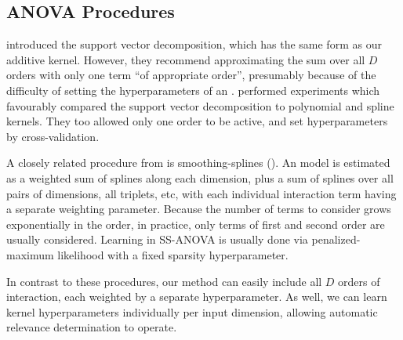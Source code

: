 \subsection{ANOVA Procedures}

\citet{vapnik1998statistical} introduced the support vector \ANOVA{} decomposition, which has the same form as our additive kernel.
However, they recommend approximating the sum over all $D$ orders with only one term ``of appropriate order'', presumably because of the difficulty of setting the hyperparameters of an \SVM{}.
\citet{stitson1999support} performed experiments which favourably compared the support vector \ANOVA{} decomposition to polynomial and spline kernels.
They too allowed only one order to be active, and set hyperparameters by cross-validation.
%

A closely related procedure from \citet{wahba1990spline} is smoothing-splines \ANOVA{} (\SSANOVA{}).
An \SSANOVA{} model is estimated as a weighted sum of splines along each dimension, plus a sum of splines over all pairs of dimensions, all triplets, etc, with each individual interaction term having a separate weighting parameter.
Because the number of terms to consider grows exponentially in the order, in practice, only terms of first and second order are usually considered.
Learning in SS-ANOVA is usually done via penalized-maximum likelihood with a fixed sparsity hyperparameter.


In contrast to these procedures, our method can easily include all $D$ orders of interaction, each weighted by a separate hyperparameter.
As well, we can learn kernel hyperparameters individually per input dimension, allowing automatic relevance determination to operate.




